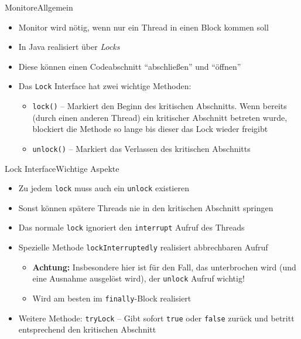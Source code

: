 \begin{frame}{Monitore}{Allgemein}
    \begin{itemize}
        \item Monitor wird nötig, wenn nur ein Thread in einen Block kommen soll
        \item In Java realisiert über \textit{Locks}
        \item Diese können einen Codeabschnitt "`abschließen"' und "`öffnen"'
        \item Das \texttt{Lock} Interface hat zwei wichtige Methoden:
        \begin{itemize}
            \item \texttt{lock()} -- Markiert den Beginn des kritischen Abschnitts. Wenn bereits (durch einen anderen Thread) ein kritischer Abschnitt betreten wurde, blockiert die Methode so lange bis dieser das Lock wieder freigibt
            \item \texttt{unlock()} -- Markiert das Verlassen des kritischen Abschnitts
        \end{itemize}
    \end{itemize}
\end{frame}

\begin{frame}{Lock Interface}{Wichtige Aspekte}
    \begin{itemize}
        \item Zu jedem \texttt{lock} muss auch ein \texttt{unlock} existieren
        \item Sonst können spätere Threads nie in den kritischen Abschnitt springen
        \item Das normale \texttt{lock} ignoriert den \texttt{interrupt} Aufruf des Threads
        \item Spezielle Methode \texttt{lockInterruptedly} realisiert abbrechbaren Aufruf
        \begin{itemize}
            \item \textbf{Achtung:} Insbesondere hier ist für den Fall, das unterbrochen wird (und eine Ausnahme ausgelöst wird), der \texttt{unlock} Aufruf wichtig!
            \item Wird am besten im \texttt{finally}-Block realisiert
        \end{itemize}
        \item Weitere Methode: \texttt{tryLock} -- Gibt sofort \texttt{true} oder \texttt{false} zurück und betritt entsprechend den kritischen Abschnitt
    \end{itemize}
\end{frame}

